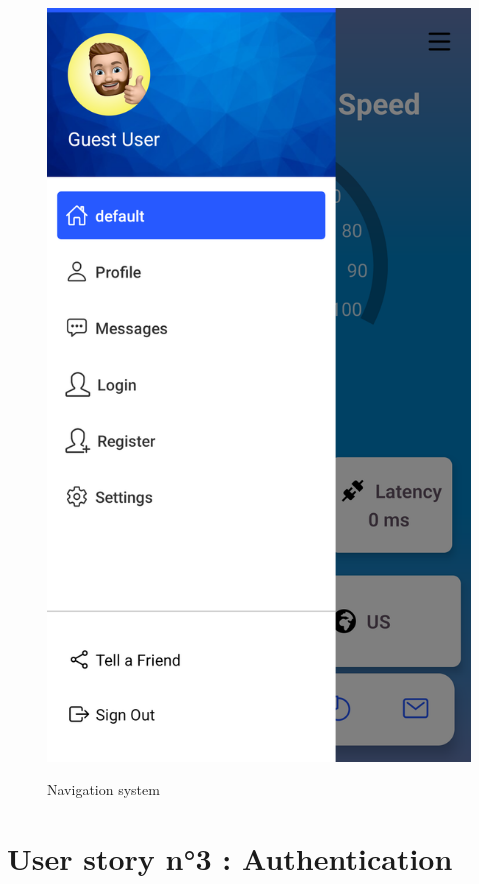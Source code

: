 \begin{figure}[H]
\begin{minipage}{0.3\textwidth}
    \label{fig:login-form}
\end{minipage}\hfill
\begin{minipage}{0.3\textwidth}
    \centering
    \includegraphics[width=\linewidth]{images/chap2/nav2.png}
    \label{fig:login-form-filled}
\end{minipage}
    \caption{Navigation system}
\end{figure}
\newpage
\section{User story n°3 : Authentication}
